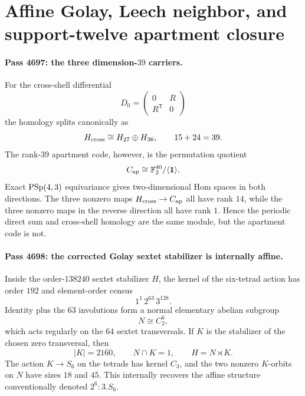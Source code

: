 \section*{Affine Golay, Leech neighbor, and support-twelve apartment closure}

\paragraph{Pass 4697: the three dimension-$39$ carriers.}
For the cross-shell differential
\[
D_0=\begin{pmatrix}0&R\\R^{\mathsf T}&0\end{pmatrix}
\]
the homology splits canonically as
\[
H_{\rm cross}\cong H_{27}\oplus H_{36},\qquad 15+24=39.
\]
The rank-$39$ apartment code, however, is the permutation quotient
\[
C_{\rm ap}\cong \mathbb F_2^{40}/\langle\mathbf1\rangle.
\]
Exact $\mathrm{PSp}(4,3)$ equivariance gives two-dimensional Hom spaces in both directions.  The three nonzero maps $H_{\rm cross}\to C_{\rm ap}$ all have rank $14$, while the three nonzero maps in the reverse direction all have rank $1$.  Hence the periodic direct sum and cross-shell homology are the same module, but the apartment code is not.

\paragraph{Pass 4698: the corrected Golay sextet stabilizer is internally affine.}
Inside the order-$138240$ sextet stabilizer $H$, the kernel of the six-tetrad action has order $192$ and element-order census
\[
1^1\,2^{63}\,3^{128}.
\]
Identity plus the $63$ involutions form a normal elementary abelian subgroup
\[
N\cong C_2^6,
\]
which acts regularly on the $64$ sextet transversals.  If $K$ is the stabilizer of the chosen zero transversal, then
\[
|K|=2160,\qquad N\cap K=1,\qquad H=N\rtimes K.
\]
The action $K\to S_6$ on the tetrads has kernel $C_3$, and the two nonzero $K$-orbits on $N$ have sizes $18$ and $45$.  This internally recovers the affine structure conventionally denoted $2^6{:}3.S_6$.

